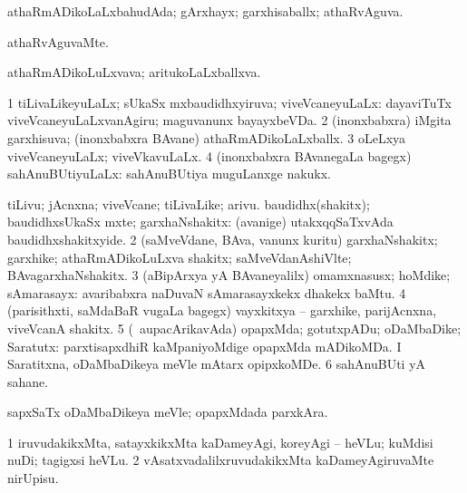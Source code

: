 {\bentry
{} 
\gl{\gu}
\expl{}
\bmng
 athaRmADikoLaLxbahudAda; gArxhayx; garxhisaballx; athaRvAguva. 
\emng
\eentry

\bentry
{} 
\gl{\kirxvi}
\expl{}
\bmng
athaRvAguvaMte. 
\emng
\eentry

\bentry
{} 
\gl{\nA}
\expl{}
\bmng
 athaRmADikoLuLxvava; aritukoLaLxballxva. 
\emng
\eentry

\bentry
{} 
\gl{\gu}
\expl{}
\bmng
\bnum
\num{1} tiLivaLikeyuLaLx; sUkaSx mxbaudidhxyiruva; viveVcaneyuLaLx:  dayaviTuTx viveVcaneyuLaLxvanAgiru; maguvanunx bayayxbeVDa. 
\num{2} (inonxbabxra) iMgita garxhisuva; (inonxbabxra BAvane) athaRmADikoLaLxballx. 
\num{3} oLeLxya viveVcaneyuLaLx; viveVkavuLaLx. 
\num{4} (inonxbabxra BAvanegaLa bagegx) sahAnuBUtiyuLaLx:  sahAnuBUtiya muguLanxge nakukx. 
\enum
\emng
\eentry

\bentry
{} 
\gl{\nA}
\expl{}
\bmng
\bnum
{} 
\banum
{} tiLivu; jAcnxna; viveVcane; tiLivaLike; arivu. 
 baudidhx(shakitx); baudidhxsUkaSx mxte; garxhaNshakitx:  (avanige) utakxqqSaTxvAda baudidhxshakitxyide. 
\eanum
\numie
\num{2} (saMveVdane, BAva, \mo vanunx kuritu) garxhaNshakitx; garxhike; athaRmADikoLuLxva shakitx; saMveVdanAshiVlte; BAvagarxhaNshakitx. 
\num{3} (aBipArxya yA BAvaneyalilx) omamxnasusx; hoMdike; sAmarasayx:  avaribabxra naDuvaN sAmarasayxkekx dhakekx baMtu. 
\num{4} (parisithxti, saMdaBaR \mo vugaLa bagegx) vayxkitxya -- garxhike, parijAcnxna, viveVcanA shakitx. 
\num{5} (\kanmu\ aupacArikavAda) opapxMda; gotutxpADu; oDaMbaDike; Saratutx:  parxtisapxdhiR kaMpaniyoMdige opapxMda mADikoMDa.  I Saratitxna, oDaMbaDikeya meVle mAtarx opipxkoMDe. 
\num{6} sahAnuBUti yA sahane. 
\enum
\emng

\noindent
\gl{\pagu}
\expl{}
\bmng
  sapxSaTx oDaMbaDikeya meVle; opapxMdada parxkAra. 
\emng
\eentry

\bentry
{} 
\gl{\sakirx}
\expl{}
\bmng
\bnum
\num{1} iruvudakikxMta, satayxkikxMta kaDameyAgi, koreyAgi -- heVLu; kuMdisi nuDi; tagigxsi heVLu. 
\num{2} vAsatxvadalilxruvudakikxMta kaDameyAgiruvaMte nirUpisu. 
\enum
\emng
\eentry

}
